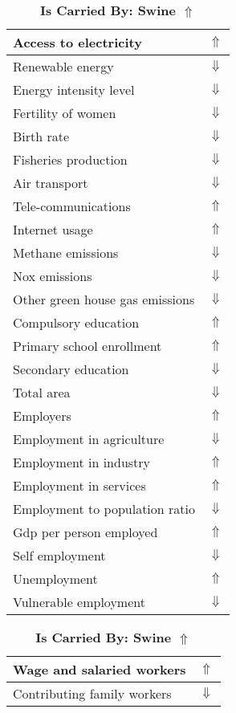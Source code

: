 \documentclass[12pt,notitlepage,oneside]{report}
\begin{document}
\clearpage
\begin{table}[!htb]
\caption{\textbf{Is Carried By: Swine $\Uparrow$}}
\centering
\label{Correlated Socio-economic Factors0}
\begin{tabular}{|l|l|}
\hline
Access to electricity & $\Uparrow$\\ \hline
Renewable energy & $\Downarrow$\\ \hline
Energy intensity level & $\Downarrow$\\ \hline
Fertility of women & $\Downarrow$\\ \hline
Birth rate & $\Downarrow$\\ \hline
Fisheries production & $\Downarrow$\\ \hline
Air transport  & $\Downarrow$\\ \hline
Tele-communications & $\Uparrow$\\ \hline
Internet usage & $\Uparrow$\\ \hline
Methane emissions & $\Downarrow$\\ \hline
Nox emissions & $\Downarrow$\\ \hline
Other green house gas emissions & $\Downarrow$\\ \hline
Compulsory education & $\Uparrow$\\ \hline
Primary school enrollment & $\Uparrow$\\ \hline
Secondary education & $\Downarrow$\\ \hline
Total area & $\Downarrow$\\ \hline
Employers & $\Uparrow$\\ \hline
Employment in agriculture & $\Downarrow$\\ \hline
Employment in industry & $\Uparrow$\\ \hline
Employment in services & $\Uparrow$\\ \hline
Employment to population ratio & $\Downarrow$\\ \hline
Gdp per person employed & $\Uparrow$\\ \hline
Self employment & $\Downarrow$\\ \hline
Unemployment & $\Uparrow$\\ \hline
Vulnerable employment & $\Downarrow$\\ \hline
\end{tabular}
\begin{tabular}{|l|l|}
\hline
Wage and salaried workers & $\Uparrow$\\ \hline
Contributing family workers & $\Downarrow$\\ \hline

\end{tabular}
\end{table}
\end{document}

